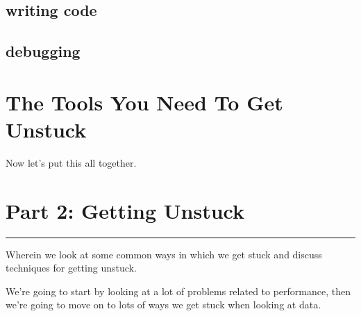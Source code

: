 \documentclass[
]{book}
\begin{document}
\hypertarget{writing-code}{%
\section{writing code}\label{writing-code}}

\hypertarget{debugging}{%
\section{debugging}\label{debugging}}

\hypertarget{the-tools}{%
\chapter{The Tools You Need To Get Unstuck}\label{the-tools}}

Now let's put this all together.

\hypertarget{part2}{%
\chapter*{Part 2: Getting Unstuck}\label{part2}}

\begin{center}\rule{0.5\linewidth}{0.5pt}\end{center}

Wherein we look at some common ways in which we get stuck and discuss techniques for getting unstuck.

We're going to start by looking at a lot of problems related to performance, then we're going to move on to lots of ways we get stuck when looking at data.

  
\end{document}
